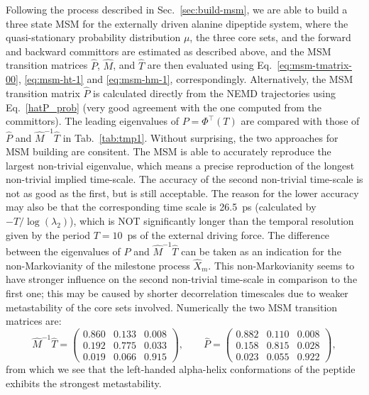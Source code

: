 \documentclass[aps, pre, preprint,unsortedaddress,a4paper,onecolumn]{revtex4}
\newcommand{\myphi}{\Phi}
\begin{document}
Following the process described in Sec.~\ref{sec:build-msm}, we are able to build a 
three state MSM for the externally driven alanine dipeptide system,
where the quasi-stationary probability distribution $\mu$, the three core sets, and the forward and backward committors are
estimated as described above, and the MSM transition matrices $\hat P$, $\hat{M}$, and $\hat{T}$ are then evaluated using Eq.~\eqref{eq:msm-tmatrix-00}, \eqref{eq:msm-ht-1} and \eqref{eq:msm-hm-1}, correspondingly.
Alternatively, the MSM  transition matrix $\hat P$ is calculated directly from the NEMD trajectories using Eq.~\eqref{hatP_prob} (very good agreement with the one computed from the committors).
The leading eigenvalues of $P=\myphi^{\top}(T)$ are compared with those of $\hat P$ and $\hat{M}^{-1}\hat{T}$ in
Tab.~\ref{tab:tmp1}.
Without surprising, the two approaches for MSM building are consitent.
The MSM is able to accurately reproduce
the largest non-trivial eigenvalue, which means a precise reproduction
of the longest non-trivial implied time-scale. The accuracy of the second non-trivial
time-scale is not as good as the first, but is still acceptable.
The reason
for the lower accuracy may also be that
the corresponding time scale is 26.5~ps (calculated by $-T/\log(\lambda_2)$),
which is NOT significantly longer than the temporal resolution given by the period $T=10$~ps of the external driving force.
The difference between the eigenvalues of $\hat P$ and $\hat{M}^{-1}\hat T$
  can be taken as an indication for the non-Markovianity of the milestone process $\hat X_m$. This
  non-Markovianity seems to have stronger influence on the second non-trivial time-scale in comparison to the first one; this may be caused by shorter decorrelation timescales due to weaker metastability of the core sets involved.
Numerically the two MSM transition matrices are:
\[
\hat{M}^{-1}\hat{T}=\left(\begin{array}{ccc}
   0.860 &   0.133 &   0.008 \\
    0.192  &  0.775  &  0.033\\
    0.019   & 0.066 &   0.915
\end{array}
\right),\qquad \hat{P}=\left(\begin{array}{ccc}
   0.882 &   0.110 &   0.008 \\
    0.158  &  0.815  &  0.028\\
    0.023   & 0.055 &   0.922
\end{array}
\right),
\]
from which we see that  the left-handed alpha-helix conformations of the peptide exhibits the strongest metastability. 
\end{document}
